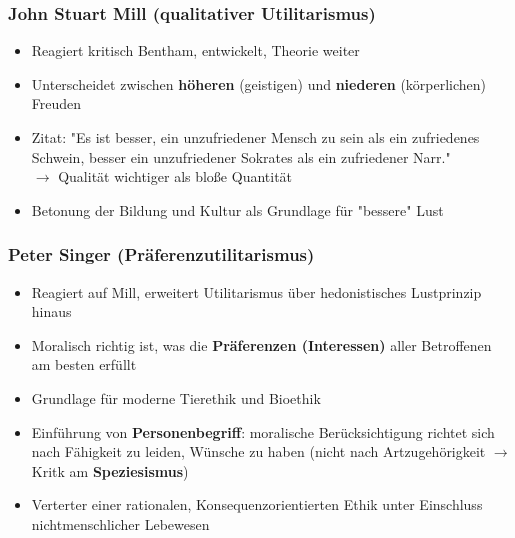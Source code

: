\subsubsection{John Stuart Mill (qualitativer Utilitarismus)}
\begin{itemize}
    \item Reagiert kritisch Bentham, entwickelt, Theorie weiter
    \item Unterscheidet zwischen \textbf{höheren} (geistigen) und \textbf{niederen} (körperlichen) Freuden
    \item Zitat: "Es ist besser, ein unzufriedener Mensch zu sein als ein zufriedenes Schwein, besser ein unzufriedener Sokrates als ein zufriedener Narr." \\
    $\rightarrow$ Qualität wichtiger als bloße Quantität
    \item Betonung der Bildung und Kultur als Grundlage für "bessere" Lust
\end{itemize}


\subsubsection{Peter Singer (Präferenzutilitarismus)}
\begin{itemize}
    \item Reagiert auf Mill, erweitert Utilitarismus über hedonistisches Lustprinzip hinaus
    \item Moralisch richtig ist, was die \textbf{Präferenzen (Interessen)} aller Betroffenen am besten erfüllt
    \item Grundlage für moderne Tierethik und Bioethik
    \item Einführung von \textbf{Personenbegriff}: moralische Berücksichtigung richtet sich nach Fähigkeit zu leiden, Wünsche zu haben (nicht nach Artzugehörigkeit $\rightarrow$ Kritk am \textbf{Speziesismus})
    \item Verterter einer rationalen, Konsequenzorientierten Ethik unter Einschluss nichtmenschlicher Lebewesen
\end{itemize}

